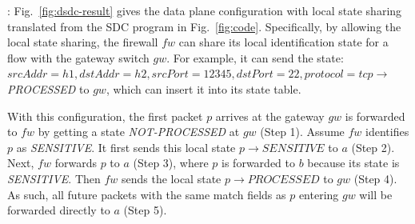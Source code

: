 :  
Fig.~\ref{fig:dsdc-result} gives the data plane configuration with local state
sharing translated from the SDC program in Fig.~\ref{fig:code}. Specifically,
by allowing the local state sharing, the
firewall $fw$ can share its local identification state for a flow with the
gateway switch $gw$.
For example, it can send the state: 
$srcAddr=h1,dstAddr=h2,srcPort=12345,dstPort=22,protocol=tcp \rightarrow$
\emph{PROCESSED} to $gw$, which can insert it into its state table.

With this configuration, the first packet $p$ arrives at the
gateway $gw$ is forwarded to $fw$ by getting a state
\emph{NOT-PROCESSED} at $gw$ (Step 1). Assume $fw$ identifies $p$ as \emph{SENSITIVE}.
It first sends this local state $p \rightarrow SENSITIVE$ to $a$ (Step 2). Next,  $fw$
forwards $p$ to $a$ (Step 3), where $p$ is forwarded to $b$ because its state is \emph{SENSITIVE}. 
Then $fw$ sends the local state $p \rightarrow PROCESSED$ to $gw$ (Step 4). As such, all future packets with the
same match fields as $p$ entering $gw$ will be forwarded directly to $a$ (Step 5).





 



